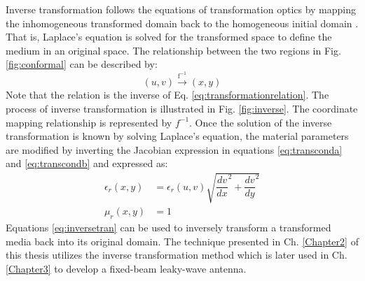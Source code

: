 Inverse transformation follows the equations of transformation optics by mapping the inhomogeneous transformed domain back to the homogeneous initial domain \cite{Zhang2010}. That is, Laplace's equation is solved for the transformed space to define the medium in an original space. The relationship between the two regions in Fig. \ref{fig:conformal} can be described by:
\begin{equation} 
	(u,v) \overset{\mathrm{f^{-1}}}{\longrightarrow} (x,y) 
\end{equation}
%
Note that the relation is the inverse of Eq. \ref{eq:transformationrelation}. The process of inverse transformation is illustrated in Fig. \ref{fig:inverse}. The coordinate mapping relationship is represented by $f^{-1}$. Once the solution of the inverse transformation is known by solving Laplace's equation, the material parameters are modified by inverting the Jacobian expression in equations \ref{eq:transconda} and \ref{eq:transcondb} and expressed as:
\begin{subequations} \label{eq:inversetran}
	\begin{align}
		\epsilon_r(x,y) &=\epsilon_r(u,v) \sqrt{\dfrac{dv}{dx}^{2}+\dfrac{dv}{dy}^{2}}  \\
		\mu_r(x,y) &=1
	\end{align}   
\end{subequations}
Equations \ref{eq:inversetran} can be used to inversely transform a transformed media back into its original domain. The technique presented in Ch. \ref{Chapter2} of this thesis utilizes the inverse transformation method which is later used in Ch. \ref{Chapter3} to develop a fixed-beam leaky-wave antenna. 

